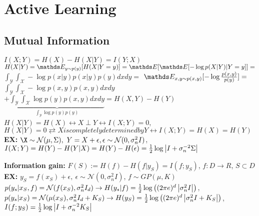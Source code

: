 \section{Active Learning}
\subsection{Mutual Information}
$I(X;Y)=H(X)-H(X|Y)=I(Y;X)$\\
$H(X|Y) = \E[y \sim p(y)]{H(X|Y=y)} = \E{\E{-\log p(X|Y)|Y=y}} =$
$\int_{\mathcal{Y}}\int_{\mathcal{X}} -\log p(x|y) p(x|y) p(y) dx dy=$
$\E[x,y \sim p(x,y)]{-\log \frac{p(x,y)}{p(y)}} =$
$\int_{\mathcal{Y}}\int_{\mathcal{X}} - \log p(x,y) p(x,y) dx dy$
$+ \underbrace{\int_{\mathcal{Y}}\int_{\mathcal{X}} \log p(y) p(x,y) dx dy}_{\int_{\mathcal{Y}} \log p(y) p(y)}
= H(X,Y) - H(Y)$
$ H(X|Y) = H(X) \leftrightarrow X \perp Y \leftrightarrow I(X;Y) = 0$,
$H(X|Y)=0 \rightleftarrow X is completely determined by Y \leftrightarrow  I(X;Y) = H(X) = H(Y)$\\
\textbf{EX:} $\X \sim \mathcal{N}(\mu, \Sigma),\ Y=X+\epsilon,
\epsilon \sim \mathcal{N}(0, \sigma_{n}^{2}I)$,
$I(X;Y)=H(Y)-H(Y|X) = H(Y)-H(\epsilon) = \frac{1}{2} \log \left\lvert I+ \sigma_{n}^{-2}\Sigma\right\rvert$

\textbf{Information gain:}
$F(S) := H(f)-H(f|y_{S}) = I(f;y_{S})$, $f: D \rightarrow R$, $S \subset D$\\
\textbf{EX:} $y_{S} = f(x_{S}) + \epsilon,\ \epsilon \sim \mathcal{N}(0, \sigma_{n}^{2}I)$, $f \sim GP(\mu, K)$
$p(y_{s}|x_{S}, f) = \mathcal{N}(f(x_{S}), \sigma_{n}^{2} I_{d})
\rightarrow H(y_{s}|f)= \frac{1}{2}\log \left((2\pi e)^{d} \left\lvert\sigma_{n}^{2}I\right\rvert\right)$,
$p(y_{s}|x_{S}) = \mathcal{N}(\mu(x_{S}), \sigma_{n}^{2} I_{d} + K_{S})
\rightarrow H(y_{S})= \frac{1}{2}\log \left((2\pi e)^{d} \left\lvert\sigma_{n}^{2}I + K_{S}\right\rvert\right)$,
$I(f;y_{S}) = \frac{1}{2} \log \left\lvert I+ \sigma_{n}^{-2} K_{S}\right\rvert$





